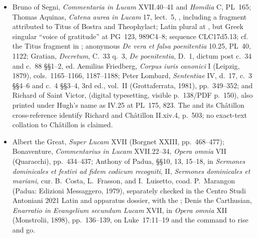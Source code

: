 {\begin{itemize}[leftmargin=1.1em,labelsep=0.35em,itemsep=0em,topsep=0.15em,parsep=0pt]
\item Bruno of Segni, \emph{Commentaria in Lucam} XVII.40--41 and
\emph{Homilia} C, PL~165; Thomas Aquinas, \emph{Catena aurea in Lucam}
17, lect.~5,
, including a fragment attributed to Titus of Bostra and
Theophylact; Latin plural  at
,
but Greek singular ``voice of gratitude'' at PG~123, 989C4--8; sequence
CLC17d5.13; cf. the Titus fragment in
;
anonymous \emph{De vera et falsa poenitentia} 10.25, PL~40, 1122;
Gratian, \emph{Decretum}, C.~33 q.~3, \emph{De poenitentia}, D.~1,
dictum post c.~34 and c.~88 \S\S1--2, ed. Aemilius Friedberg,
\emph{Corpus iuris canonici} I (Leipzig, 1879), cols.~1165--1166,
1187--1188; Peter Lombard, \emph{Sententiae} IV, d.~17, c.~3
\S\S4--6 and c.~4 \S\S3--4, 3rd ed., vol.~II (Grottaferrata, 1981),
pp.~349--352; and Richard of Saint Victor,
(digital typesetting, visible p.~138/PDF p.~150), also printed under Hugh's
name as IV.25 at PL~175, 823.  The
and its Châtillon cross-reference identify Richard and Châtillon II.xiv.4,
p.~503; no exact-text collation to Châtillon is claimed.

\item Albert the Great, \emph{Super Lucam} XVII (Borgnet XXIII,
pp.~468--477); Bonaventure, \emph{Commentarius in Lucam} XVII.22--34,
\emph{Opera omnia} VII (Quaracchi), pp.~434--437; Anthony of Padua,
\S\S10, 13, 15--18, in \emph{Sermones dominicales et festivi ad fidem
codicum recogniti}, II, \emph{Sermones dominicales et mariani}, cur.
B.~Costa, L.~Frasson, and I.~Luisetto, coad. P.~Marangon (Padua: Edizioni
Messaggero, 1979), separately checked in the Centro Studi Antoniani 2021 Latin
and apparatus
dossier, with the
; Denis the Carthusian,
\emph{Enarratio in Evangelium secundum Lucam}
XVII, in \emph{Opera omnia} XII (Monstrolii, 1898), pp.~136--139, on
Luke~17:11--19 and the command to rise and go.


\end{itemize}}
